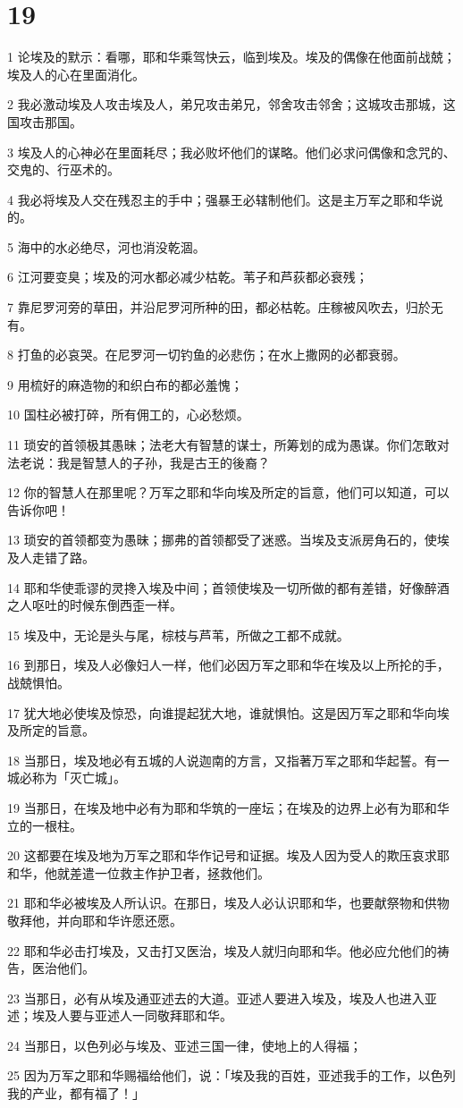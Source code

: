 \chapter{19}

\par 1 论埃及的默示：看哪，耶和华乘驾快云，临到埃及。埃及的偶像在他面前战兢；埃及人的心在里面消化。
\par 2 我必激动埃及人攻击埃及人，弟兄攻击弟兄，邻舍攻击邻舍；这城攻击那城，这国攻击那国。
\par 3 埃及人的心神必在里面耗尽；我必败坏他们的谋略。他们必求问偶像和念咒的、交鬼的、行巫术的。
\par 4 我必将埃及人交在残忍主的手中；强暴王必辖制他们。这是主万军之耶和华说的。
\par 5 海中的水必绝尽，河也消没乾涸。
\par 6 江河要变臭；埃及的河水都必减少枯乾。苇子和芦荻都必衰残；
\par 7 靠尼罗河旁的草田，并沿尼罗河所种的田，都必枯乾。庄稼被风吹去，归於无有。
\par 8 打鱼的必哀哭。在尼罗河一切钓鱼的必悲伤；在水上撒网的必都衰弱。
\par 9 用梳好的麻造物的和织白布的都必羞愧；
\par 10 国柱必被打碎，所有佣工的，心必愁烦。
\par 11 琐安的首领极其愚昧；法老大有智慧的谋士，所筹划的成为愚谋。你们怎敢对法老说：我是智慧人的子孙，我是古王的後裔？
\par 12 你的智慧人在那里呢？万军之耶和华向埃及所定的旨意，他们可以知道，可以告诉你吧！
\par 13 琐安的首领都变为愚昧；挪弗的首领都受了迷惑。当埃及支派房角石的，使埃及人走错了路。
\par 14 耶和华使乖谬的灵搀入埃及中间；首领使埃及一切所做的都有差错，好像醉酒之人呕吐的时候东倒西歪一样。
\par 15 埃及中，无论是头与尾，棕枝与芦苇，所做之工都不成就。
\par 16 到那日，埃及人必像妇人一样，他们必因万军之耶和华在埃及以上所抡的手，战兢惧怕。
\par 17 犹大地必使埃及惊恐，向谁提起犹大地，谁就惧怕。这是因万军之耶和华向埃及所定的旨意。
\par 18 当那日，埃及地必有五城的人说迦南的方言，又指著万军之耶和华起誓。有一城必称为「灭亡城」。
\par 19 当那日，在埃及地中必有为耶和华筑的一座坛；在埃及的边界上必有为耶和华立的一根柱。
\par 20 这都要在埃及地为万军之耶和华作记号和证据。埃及人因为受人的欺压哀求耶和华，他就差遣一位救主作护卫者，拯救他们。
\par 21 耶和华必被埃及人所认识。在那日，埃及人必认识耶和华，也要献祭物和供物敬拜他，并向耶和华许愿还愿。
\par 22 耶和华必击打埃及，又击打又医治，埃及人就归向耶和华。他必应允他们的祷告，医治他们。
\par 23 当那日，必有从埃及通亚述去的大道。亚述人要进入埃及，埃及人也进入亚述；埃及人要与亚述人一同敬拜耶和华。
\par 24 当那日，以色列必与埃及、亚述三国一律，使地上的人得福；
\par 25 因为万军之耶和华赐福给他们，说：「埃及我的百姓，亚述我手的工作，以色列我的产业，都有福了！」

